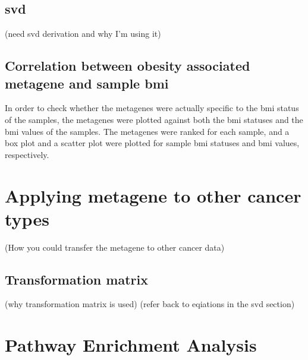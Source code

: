 \subsection{\gls{svd}}
\label{subsec:svd}

(need svd derivation and why I'm using it)

\subsection{Correlation between obesity associated metagene and sample \gls{bmi}}
\label{subsec:metavsbmi}

In order to check whether the metagenes were actually specific to the \gls{bmi} status of the samples, the metagenes were plotted against both the \gls{bmi} statuses and the \gls{bmi} values of the samples.
The metagenes were ranked for each sample, and a box plot and a scatter plot were plotted for sample \gls{bmi} statuses and \gls{bmi} values, respectively.

\section{Applying metagene to other cancer types}
\label{sec:metagene}

(How you could transfer the metagene to other cancer data)

\subsection{Transformation matrix}
\label{subsec:transmat}

(why transformation matrix is used)
(refer back to eqiations in the  svd section)

\section{Pathway Enrichment Analysis}
\label{sec:pathenrich}







